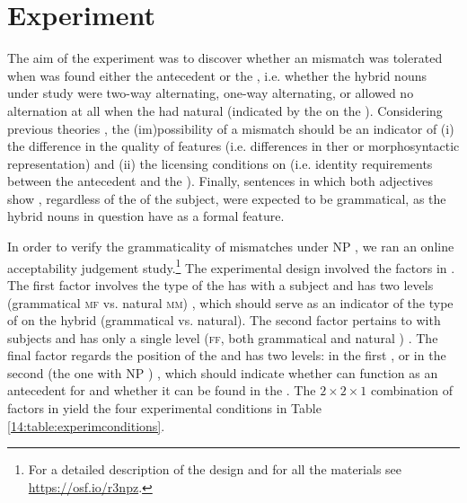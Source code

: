 \documentclass[output=paper,modfonts,newtxmath,hidelinks]{langscibook}
\begin{document}
     
\section{Experiment}

The aim of the experiment was to discover whether an  mismatch was tolerated when   was found either the antecedent  or the  , i.e. whether the hybrid nouns under study were two-way alternating, one-way alternating, or allowed no alternation at all when the  had natural    (indicated by the  on the ). Considering previous theories \citep{nuneszocca10,bobaljikzocca,merchant14,sudospathas-sub20}, the (im)possibility of a mismatch should be an indicator of (i) the difference in the quality of  features (i.e. differences in ther  or morphosyntactic representation) and (ii) the licensing conditions on  (i.e. identity requirements between the antecedent and the ). Finally, sentences in which both adjectives show  , regardless of the  of the subject, were expected to be grammatical, as the hybrid nouns in question have  as a formal feature. 

In order to verify the grammaticality of  mismatches under NP , we ran an online acceptability judgement study.\footnote{For a detailed description of the design and for all the materials see \url{https://osf.io/r3npz}.} 
The experimental design involved the factors  in . The first factor involves the type of  the  has with a  subject and has two levels (grammatical  \textsc{mf} vs. natural  \textsc{mm}) , which should serve as an indicator of the type of  on the hybrid  (grammatical vs. natural).
The second factor pertains to  with  subjects and has only a single level (\textsc{ff}, both grammatical and natural ) . The final factor regards the position of the   and has two levels:
in the first , or in  the second  (the one with NP ) , which should indicate whether  can function as an antecedent for  and whether it can be found in the . The $2\times 2\times 1$ combination of factors in  yield the four experimental conditions in Table \ref{14:table:experimconditions}.
\end{document}
